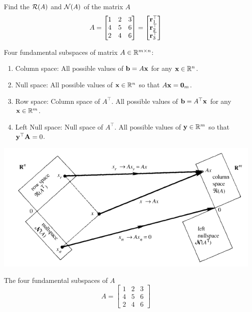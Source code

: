 \documentclass[times,t]{beamer}
\begin{document}
\begin{frame}
  Find the ${\cal R}(A)$ and ${\cal N}(A)$ of the matrix $A$
  \[
    A   =  \begin{bmatrix}
      1 &   2  &  3  \\
      4 & 5 &   6 \\
      2 & 4 &   6
    \end{bmatrix}
    = \begin{bmatrix}  \mathbf{r}_1^\top  \\  \mathbf{r}_2^\top \\ \mathbf{r}_3^\top\end{bmatrix}
  \]
\end{frame}

\begin{frame}
  Four fundamental subspaces of matrix $A\in \mathbb{R}^{m\times n}$:
\begin{enumerate}
    \item Column space: All possible values of $\mathbf{b} = A\mathbf{x}$ for any $\mathbf{x} \in \mathbb{R}^n$.
    \item Null space: All possible values of $\mathbf{x} \in \mathbb{R}^n$ so that $A\mathbf{x} = \boldsymbol{0}_m$.
    \item Row space: Column space of $A^\top$. All possible values of
      $\mathbf{b} = A^\top\mathbf{x}$ for any $\mathbf{x} \in \mathbb{R}^m$.
    \item Left Null space: Null space of $A^\top$. All possible values of $\mathbf{y}
      \in \mathbb{R}^{m}$ so that $\mathbf{y}^\top\mathbf{A} = 0$.
 \end{enumerate}
\end{frame}

\begin{frame}
  \includegraphics[width=0.7\linewidth]{media/four-fundamental-subspaces.png}
\end{frame}

\begin{frame}
  The four fundamental subspaces of $A$
    \[
    A   =  \begin{bmatrix}
      1 &   2  &  3  \\
      4 & 5 &   6 \\
      2 & 4 &   6
      \end{bmatrix}
      \]
\end{frame}
\end{document}
